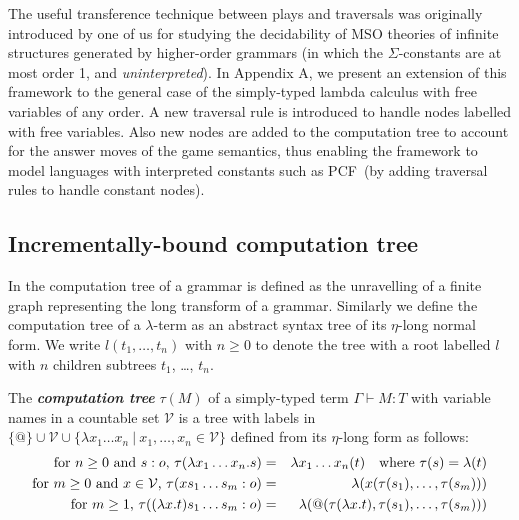 \documentclass{llncs}
\newcommand\defname[1]{{\bf\em #1}\index{#1}}
\newcommand\union{\cup}
\newcommand\pcf{\textsf{PCF}}
\begin{document}
The useful transference technique between plays and traversals was
originally introduced by one of us \cite{OngLics2006} for studying the
decidability of MSO theories of infinite structures generated by
higher-order grammars (in which the $\Sigma$-constants are at most
order 1, and \emph{uninterpreted}).
In Appendix A, we present an extension of this framework to the
general case of the simply-typed lambda calculus with free variables
of any order. A new traversal rule is introduced to handle nodes
labelled with free variables. Also new nodes are added to the
computation tree to account for the answer moves of the game
semantics, thus enabling the framework to model languages with
interpreted constants such as \pcf~(by adding traversal rules to
handle constant nodes).

\subsection*{Incrementally-bound computation tree}

In \cite{OngLics2006} the computation tree of a grammar is defined as
the unravelling of a finite graph representing the long transform of a
grammar. Similarly we define the computation tree of a $\lambda$-term
as an abstract syntax tree of its $\eta$-long normal form.  We write
$l(t_1, \ldots, t_n)$ with $n \geq 0$ to denote the tree with a root
labelled $l$ with $n$ children subtrees $t_1$, \ldots, $t_n$.

\begin{definition}\rm
\label{dfn:comptree}
  The \defname{computation tree} $\tau(M)$ of a simply-typed term
  $\Gamma \vdash M:T$ with variable names in a countable set
  $\mathcal{V}$ is a tree with labels in $ \{ @ \} \union \mathcal{V}
  \union \{ \lambda x_1 \ldots x_n \ | \ x_1 ,\ldots, x_n \in
  \mathcal{V} \}$ defined from its $\eta$-long form as follows:
\begin{eqnarray*}
  \mbox{for $n\geq 0$ and $s:o$, } \tau(\lambda x_1 \ldots x_n . s) &=& \lambda x_1 \ldots x_n(t) \mbox{\quad where $\tau(s) = \lambda(t)$}\\
  \mbox{for $m\geq 0$ and $x \in  \mathcal{V}$, } \tau( x s_1 \ldots s_m : o) &=&  \lambda (x(\tau(s_1),\ldots,\tau(s_m)))\\
  \mbox{for $m \geq 1$, } \tau((\lambda x.t) s_1 \ldots s_m :o) &=& \lambda (@(\tau(\lambda x.t),\tau(s_1),\ldots,\tau(s_m)))
\end{eqnarray*}
\end{definition}
\end{document}
